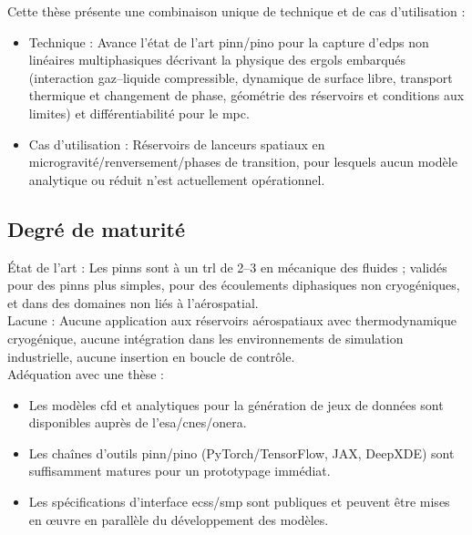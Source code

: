 \documentclass[12pt]{article}
\begin{document}
	Cette thèse présente une combinaison unique de technique et de cas d’utilisation :
	
	\begin{itemize}
		\item Technique : Avance l’état de l’art \acrshort{pinn}/\acrshort{pino} pour la capture d’\acrshort{edps} non linéaires multiphasiques décrivant la physique des ergols embarqués (interaction gaz–liquide compressible, dynamique de surface libre, transport thermique et changement de phase, géométrie des réservoirs et conditions aux limites) et différentiabilité pour le \gls{mpc}.
		
		\item Cas d’utilisation : Réservoirs de lanceurs spatiaux en microgravité/renversement/phases de transition, pour lesquels aucun modèle analytique ou réduit n’est actuellement opérationnel.
	\end{itemize}
	
	\subsection*{Degré de maturité}
	
	
	État de l’art : Les \acrshort{pinn}s sont à un \acrshort{trl} de 2–3 en mécanique des fluides ; validés pour des \acrshort{pinn}s plus simples, pour des écoulements diphasiques non cryogéniques, et dans des domaines non liés à l’aérospatial.
	\\
	
	Lacune : Aucune application aux réservoirs aérospatiaux avec thermodynamique cryogénique, aucune intégration dans les environnements de simulation industrielle, aucune insertion en boucle de contrôle.
	\\
	
	Adéquation avec une thèse :
	
	\begin{itemize}
		\item Les modèles \acrshort{cfd} et analytiques pour la génération de jeux de données sont disponibles auprès de l’\acrshort{esa}/\acrshort{cnes}/\acrshort{onera}.
		
		\item Les chaînes d’outils \acrshort{pinn}/\acrshort{pino} (PyTorch/TensorFlow, JAX, DeepXDE) sont suffisamment matures pour un prototypage immédiat.
		
		\item Les spécifications d’interface \acrshort{ecss}/\acrshort{smp} sont publiques et peuvent être mises en œuvre en parallèle du développement des modèles.
		
	\end{itemize}	
	
\end{document}
